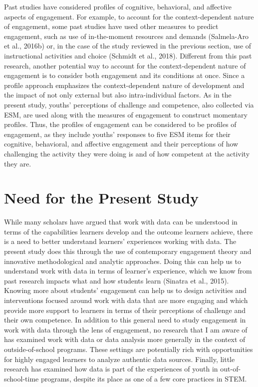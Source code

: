 \documentclass[]{book}
\theoremstyle{definition}
\theoremstyle{definition}
\theoremstyle{definition}
\theoremstyle{remark}
\begin{document}
Past studies have considered profiles of cognitive, behavioral, and
affective aspects of engagement. For example, to account for the
context-dependent nature of engagement, some past studies have used
other measures to predict engagement, such as use of in-the-moment
resources and demands (Salmela-Aro et al., 2016b) or, in the case of the
study reviewed in the previous section, use of instructional activities
and choice (Schmidt et al., 2018). Different from this past research,
another potential way to account for the context-dependent nature of
engagement is to consider both engagement and its conditions at once.
Since a profile approach emphasizes the context-dependent nature of
development and the impact of not only external but also
intra-individual factors. As in the present study, youths' perceptions
of challenge and competence, also collected via ESM, are used along with
the measures of engagement to construct momentary profiles. Thus, the
profiles of engagement can be considered to be profiles of engagement,
as they include youths' responses to five ESM items for their cognitive,
behavioral, and affective engagement and their perceptions of how
challenging the activity they were doing is and of how competent at the
activity they are.

\section{Need for the Present Study}\label{need-for-the-present-study}

While many scholars have argued that work with data can be understood in
terms of the capabilities learners develop and the outcome learners
achieve, there is a need to better understand learners' experiences
working with data. The present study does this through the use of
contemporary engagement theory and innovative methodological and
analytic approaches. Doing this can help us to understand work with data
in terms of learner's experience, which we know from past research
impacts what and how students learn (Sinatra et al., 2015). Knowing more
about students' engagement can help us to design activities and
interventions focused around work with data that are more engaging and
which provide more support to learners in terms of their perceptions of
challenge and their own competence. In addition to this general need to
study engagement in work with data through the lens of engagement, no
research that I am aware of has examined work with data or data analysis
more generally in the context of outside-of-school programs. These
settings are potentially rich with opportunities for highly engaged
learners to analyze authentic data sources. Finally, little research has
examined how data is part of the experiences of youth in
out-of-school-time programs, despite its place as one of a few core
practices in STEM.
\end{document}

